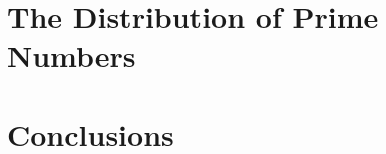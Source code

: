 \documentclass[11pt]{report} %
\numberwithin{equation}{chapter}
\theoremstyle{definition}
\theoremstyle{remark}
\begin{document}
\chapter{The Distribution of Prime Numbers}






\chapter{Conclusions}

\begin{appendices}

\renewcommand{\thesection}{\arabic{section}}
\renewcommand{\theequation}{A\arabic{equation}}
\renewcommand{\thetheorem}{A\arabic{theorem}}






\end{appendices}



\end{document}
